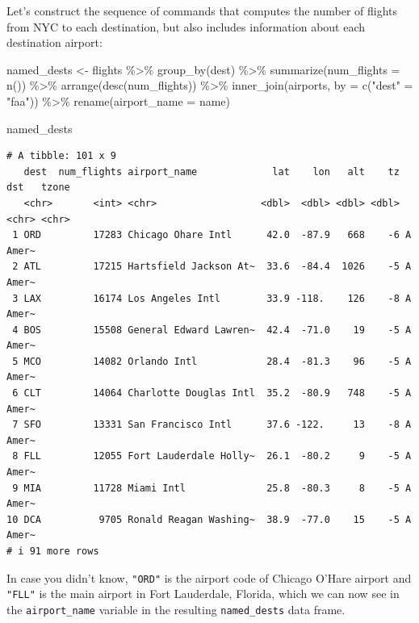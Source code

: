 \documentclass[
  letterpaper,
  DIV=11,
  numbers=noendperiod]{scrreprt}
\newenvironment{Shaded}{\begin{snugshade}}{\end{snugshade}}
\newcommand{\AttributeTok}[1]{\textcolor[rgb]{0.40,0.45,0.13}{#1}}
\newcommand{\FunctionTok}[1]{\textcolor[rgb]{0.28,0.35,0.67}{#1}}
\newcommand{\NormalTok}[1]{\textcolor[rgb]{0.00,0.23,0.31}{#1}}
\newcommand{\OtherTok}[1]{\textcolor[rgb]{0.00,0.23,0.31}{#1}}
\newcommand{\SpecialCharTok}[1]{\textcolor[rgb]{0.37,0.37,0.37}{#1}}
\newcommand{\StringTok}[1]{\textcolor[rgb]{0.13,0.47,0.30}{#1}}
\theoremstyle{definition}
\theoremstyle{remark}
\begin{document}
Let's construct the sequence of commands that computes the number of
flights from NYC to each destination, but also includes information
about each destination airport:

\begin{Shaded}
\begin{Highlighting}[]
\NormalTok{named\_dests }\OtherTok{\textless{}{-}}\NormalTok{ flights }\SpecialCharTok{\%\textgreater{}\%}
  \FunctionTok{group\_by}\NormalTok{(dest) }\SpecialCharTok{\%\textgreater{}\%}
  \FunctionTok{summarize}\NormalTok{(}\AttributeTok{num\_flights =} \FunctionTok{n}\NormalTok{()) }\SpecialCharTok{\%\textgreater{}\%}
  \FunctionTok{arrange}\NormalTok{(}\FunctionTok{desc}\NormalTok{(num\_flights)) }\SpecialCharTok{\%\textgreater{}\%}
  \FunctionTok{inner\_join}\NormalTok{(airports, }\AttributeTok{by =} \FunctionTok{c}\NormalTok{(}\StringTok{"dest"} \OtherTok{=} \StringTok{"faa"}\NormalTok{)) }\SpecialCharTok{\%\textgreater{}\%}
  \FunctionTok{rename}\NormalTok{(}\AttributeTok{airport\_name =}\NormalTok{ name)}

\NormalTok{named\_dests}
\end{Highlighting}
\end{Shaded}

\begin{verbatim}
# A tibble: 101 x 9
   dest  num_flights airport_name             lat    lon   alt    tz dst   tzone
   <chr>       <int> <chr>                  <dbl>  <dbl> <dbl> <dbl> <chr> <chr>
 1 ORD         17283 Chicago Ohare Intl      42.0  -87.9   668    -6 A     Amer~
 2 ATL         17215 Hartsfield Jackson At~  33.6  -84.4  1026    -5 A     Amer~
 3 LAX         16174 Los Angeles Intl        33.9 -118.    126    -8 A     Amer~
 4 BOS         15508 General Edward Lawren~  42.4  -71.0    19    -5 A     Amer~
 5 MCO         14082 Orlando Intl            28.4  -81.3    96    -5 A     Amer~
 6 CLT         14064 Charlotte Douglas Intl  35.2  -80.9   748    -5 A     Amer~
 7 SFO         13331 San Francisco Intl      37.6 -122.     13    -8 A     Amer~
 8 FLL         12055 Fort Lauderdale Holly~  26.1  -80.2     9    -5 A     Amer~
 9 MIA         11728 Miami Intl              25.8  -80.3     8    -5 A     Amer~
10 DCA          9705 Ronald Reagan Washing~  38.9  -77.0    15    -5 A     Amer~
# i 91 more rows
\end{verbatim}

In case you didn't know, \texttt{"ORD"} is the airport code of Chicago
O'Hare airport and \texttt{"FLL"} is the main airport in Fort
Lauderdale, Florida, which we can now see in the \texttt{airport\_name}
variable in the resulting \texttt{named\_dests} data frame.
\end{document}
